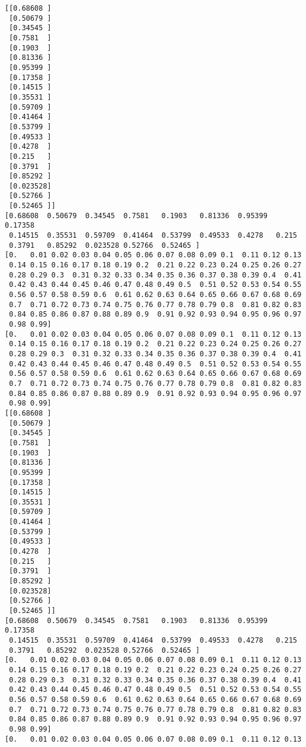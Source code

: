 \documentclass[11pt]{article}
\begin{document}
    \begin{Verbatim}[commandchars=\\\{\}]
[[0.68608 ]
 [0.50679 ]
 [0.34545 ]
 [0.7581  ]
 [0.1903  ]
 [0.81336 ]
 [0.95399 ]
 [0.17358 ]
 [0.14515 ]
 [0.35531 ]
 [0.59709 ]
 [0.41464 ]
 [0.53799 ]
 [0.49533 ]
 [0.4278  ]
 [0.215   ]
 [0.3791  ]
 [0.85292 ]
 [0.023528]
 [0.52766 ]
 [0.52465 ]]
[0.68608  0.50679  0.34545  0.7581   0.1903   0.81336  0.95399  0.17358
 0.14515  0.35531  0.59709  0.41464  0.53799  0.49533  0.4278   0.215
 0.3791   0.85292  0.023528 0.52766  0.52465 ]
[0.   0.01 0.02 0.03 0.04 0.05 0.06 0.07 0.08 0.09 0.1  0.11 0.12 0.13
 0.14 0.15 0.16 0.17 0.18 0.19 0.2  0.21 0.22 0.23 0.24 0.25 0.26 0.27
 0.28 0.29 0.3  0.31 0.32 0.33 0.34 0.35 0.36 0.37 0.38 0.39 0.4  0.41
 0.42 0.43 0.44 0.45 0.46 0.47 0.48 0.49 0.5  0.51 0.52 0.53 0.54 0.55
 0.56 0.57 0.58 0.59 0.6  0.61 0.62 0.63 0.64 0.65 0.66 0.67 0.68 0.69
 0.7  0.71 0.72 0.73 0.74 0.75 0.76 0.77 0.78 0.79 0.8  0.81 0.82 0.83
 0.84 0.85 0.86 0.87 0.88 0.89 0.9  0.91 0.92 0.93 0.94 0.95 0.96 0.97
 0.98 0.99]
[0.   0.01 0.02 0.03 0.04 0.05 0.06 0.07 0.08 0.09 0.1  0.11 0.12 0.13
 0.14 0.15 0.16 0.17 0.18 0.19 0.2  0.21 0.22 0.23 0.24 0.25 0.26 0.27
 0.28 0.29 0.3  0.31 0.32 0.33 0.34 0.35 0.36 0.37 0.38 0.39 0.4  0.41
 0.42 0.43 0.44 0.45 0.46 0.47 0.48 0.49 0.5  0.51 0.52 0.53 0.54 0.55
 0.56 0.57 0.58 0.59 0.6  0.61 0.62 0.63 0.64 0.65 0.66 0.67 0.68 0.69
 0.7  0.71 0.72 0.73 0.74 0.75 0.76 0.77 0.78 0.79 0.8  0.81 0.82 0.83
 0.84 0.85 0.86 0.87 0.88 0.89 0.9  0.91 0.92 0.93 0.94 0.95 0.96 0.97
 0.98 0.99]
[[0.68608 ]
 [0.50679 ]
 [0.34545 ]
 [0.7581  ]
 [0.1903  ]
 [0.81336 ]
 [0.95399 ]
 [0.17358 ]
 [0.14515 ]
 [0.35531 ]
 [0.59709 ]
 [0.41464 ]
 [0.53799 ]
 [0.49533 ]
 [0.4278  ]
 [0.215   ]
 [0.3791  ]
 [0.85292 ]
 [0.023528]
 [0.52766 ]
 [0.52465 ]]
[0.68608  0.50679  0.34545  0.7581   0.1903   0.81336  0.95399  0.17358
 0.14515  0.35531  0.59709  0.41464  0.53799  0.49533  0.4278   0.215
 0.3791   0.85292  0.023528 0.52766  0.52465 ]
[0.   0.01 0.02 0.03 0.04 0.05 0.06 0.07 0.08 0.09 0.1  0.11 0.12 0.13
 0.14 0.15 0.16 0.17 0.18 0.19 0.2  0.21 0.22 0.23 0.24 0.25 0.26 0.27
 0.28 0.29 0.3  0.31 0.32 0.33 0.34 0.35 0.36 0.37 0.38 0.39 0.4  0.41
 0.42 0.43 0.44 0.45 0.46 0.47 0.48 0.49 0.5  0.51 0.52 0.53 0.54 0.55
 0.56 0.57 0.58 0.59 0.6  0.61 0.62 0.63 0.64 0.65 0.66 0.67 0.68 0.69
 0.7  0.71 0.72 0.73 0.74 0.75 0.76 0.77 0.78 0.79 0.8  0.81 0.82 0.83
 0.84 0.85 0.86 0.87 0.88 0.89 0.9  0.91 0.92 0.93 0.94 0.95 0.96 0.97
 0.98 0.99]
[0.   0.01 0.02 0.03 0.04 0.05 0.06 0.07 0.08 0.09 0.1  0.11 0.12 0.13

\end{Verbatim}
\end{document}

